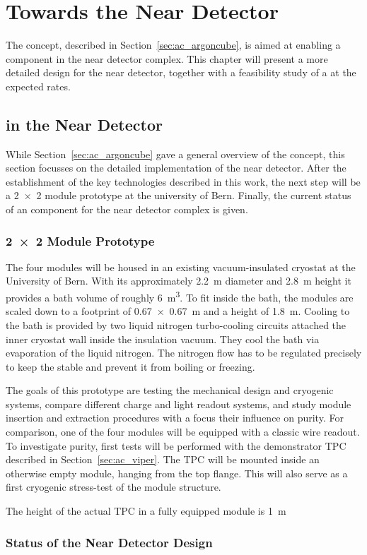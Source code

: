 \chapter{Towards the \dune{} Near Detector}
\label{chap:dune-nd}

The \AC{} concept, described in Section~\ref{sec:ac_argoncube}, is aimed at enabling a \lartpc{} component in the \dune{} near detector complex.
This chapter will present a more detailed design for the near detector, together with a feasibility study of a \lartpc{} at the expected rates.


\section{\AC{} in the \dune{} Near Detector}
\label{sec:dune-nd_ac}

While Section~\ref{sec:ac_argoncube} gave a general overview of the \AC{} concept, this section focusses on the detailed implementation of the \dune{} near detector.
After the establishment of the key technologies described in this work, the next step will be a \num{2 x 2} module prototype at the university of Bern.
Finally, the current status of an \AC{} \lartpc{} component for the \dune{} near detector complex is given.

\subsection*{\num{2 x 2} Module Prototype}

The four modules will be housed in an existing vacuum-insulated cryostat at the University of Bern.
With its approximately \SI{2.2}{\metre} diameter and \SI{2.8}{\metre} height it provides a \lar{} bath volume of roughly \SI{6}{\metre\cubed}.
To fit inside the bath, the modules are scaled down to a footprint of \SI{0.67 x 0.67}{\metre} and a height of \SI{1.8}{\metre}.
Cooling to the bath is provided by two liquid nitrogen turbo-cooling circuits attached the inner cryostat wall inside the insulation vacuum.
They cool the \lar{} bath via evaporation of the liquid nitrogen.
The nitrogen flow has to be regulated precisely to keep the \lar{} stable and prevent it from boiling or freezing.

The goals of this prototype are testing the mechanical design and cryogenic systems, compare different charge and light readout systems, and study module insertion and extraction procedures with a focus their influence on purity.
For comparison, one of the four modules will be equipped with a classic wire readout.
To investigate purity, first tests will be performed with the \AC{} demonstrator TPC described in Section~\ref{sec:ac_viper}.
The TPC will be mounted inside an otherwise empty module, hanging from the top flange.
This will also serve as a first cryogenic stress-test of the module structure.

The height of the actual TPC in a fully equipped module is \SI{1}{\metre}


\subsection*{Status of the Near Detector Design}

\afterpage{\clearpage}